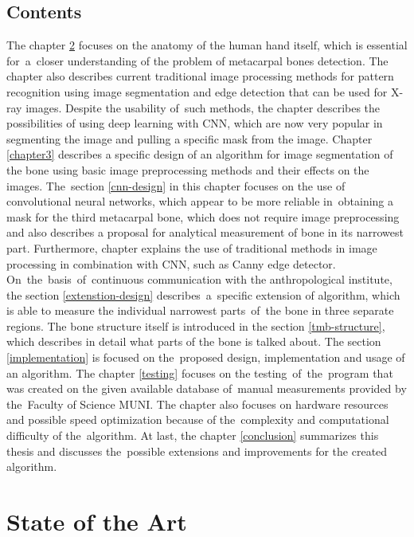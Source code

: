 \section{Contents}
The chapter \ref{state-of-the-art} focuses on the anatomy of the human hand itself, which is essential for~a~closer understanding of the problem of metacarpal bones detection. The chapter also describes current traditional image processing methods for pattern recognition using image segmentation and edge detection that can be used for X-ray images. Despite the usability of~such methods, the chapter describes the possibilities of using deep learning with CNN, which are now very popular in segmenting the image and pulling a specific mask from the image. Chapter \ref{chapter3} describes a specific design of an algorithm for image segmentation of the bone using basic image preprocessing methods and their effects on the images. The~section \ref{cnn-design} in this chapter focuses on the use of convolutional neural networks, which appear to be more reliable in~obtaining a mask for the third metacarpal bone, which does not require image preprocessing and also describes a proposal for analytical measurement of bone in its narrowest part. Furthermore, chapter explains the use of traditional methods in image processing in combination with CNN, such as Canny edge detector. On~the~basis~of~continuous communication with the anthropological institute, the section \ref{extenstion-design} describes~a~specific extension of algorithm, which is able to measure the individual narrowest parts~of~the bone in three separate regions. The bone structure itself is introduced in the section \ref{tmb-structure}, which describes in detail what parts of the bone is talked about. The section \ref{implementation} is focused on the~proposed design, implementation and usage of an algorithm. The chapter \ref{testing} focuses on the testing~of~the~program that was created on the given available database of~manual measurements provided by the~Faculty of Science MUNI. The chapter also focuses on hardware resources and possible speed optimization because of the~complexity and computational difficulty of the~algorithm. At last, the chapter \ref{conclusion} summarizes this thesis and discusses the~possible extensions and improvements for the created algorithm.

\chapter{State of the Art}
\label{state-of-the-art}


